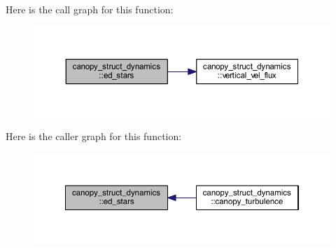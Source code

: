 Here is the call graph for this function\+:\nopagebreak
\begin{figure}[H]
\begin{center}
\leavevmode
\includegraphics[width=350pt]{namespacecanopy__struct__dynamics_aecb5209e48d8e43c4c1b214d31d3f7e2_cgraph}
\end{center}
\end{figure}




Here is the caller graph for this function\+:\nopagebreak
\begin{figure}[H]
\begin{center}
\leavevmode
\includegraphics[width=350pt]{namespacecanopy__struct__dynamics_aecb5209e48d8e43c4c1b214d31d3f7e2_icgraph}
\end{center}
\end{figure}


\hypertarget{namespacecanopy__struct__dynamics_a3a475e27ec763919f874021a412cf343}{}
